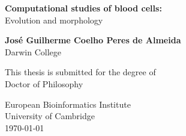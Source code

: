 \begin{titlepage}
   \begin{center}
       \vspace*{1cm}

       {\huge \textbf{Computational studies of blood cells:}}\\
       \vspace{0.3cm}
       {\huge Evolution and morphology}
            
       \vspace{1.5cm}

       \textbf{José Guilherme Coelho Peres de Almeida}\\
       Darwin College
       \vfill
            
       This thesis is submitted for the degree of\\
       Doctor of Philosophy
            
       \vspace{0.8cm}
            
       European Bioinformatics Institute\\
       University of Cambridge\\
       \today
            
   \end{center}
\end{titlepage}